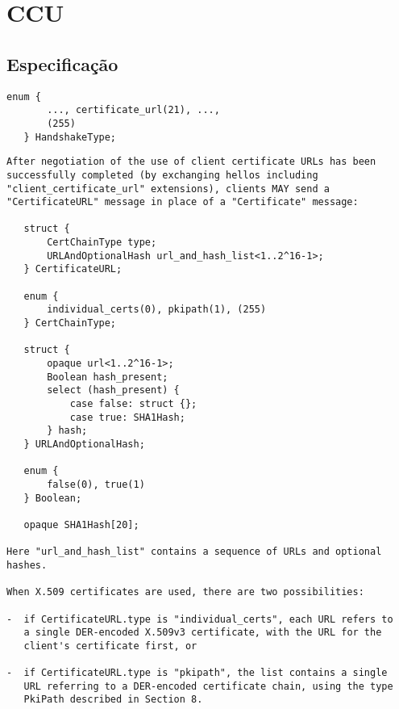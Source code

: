 
\section{\acl{CCU}}

\subsection{Especificação}

\begin{lstlisting}[caption={Definição do novo tipo de mensagem de \emph{handshake} \tlsHsCu}]
   enum { 
       ..., certificate_url(21), ..., 
       (255) 
   } HandshakeType;
\end{lstlisting}

\begin{lstlisting}[caption={RFC 3546, trecho da seção 3.3}]
After negotiation of the use of client certificate URLs has been 
successfully completed (by exchanging hellos including 
"client_certificate_url" extensions), clients MAY send a 
"CertificateURL" message in place of a "Certificate" message: 
 
   struct { 
       CertChainType type; 
       URLAndOptionalHash url_and_hash_list<1..2^16-1>; 
   } CertificateURL; 
 
   enum { 
       individual_certs(0), pkipath(1), (255) 
   } CertChainType; 
 
   struct { 
       opaque url<1..2^16-1>; 
       Boolean hash_present; 
       select (hash_present) { 
           case false: struct {}; 
           case true: SHA1Hash; 
       } hash; 
   } URLAndOptionalHash; 
 
   enum { 
       false(0), true(1) 
   } Boolean; 
 
   opaque SHA1Hash[20]; 
 
Here "url_and_hash_list" contains a sequence of URLs and optional 
hashes. 
 
When X.509 certificates are used, there are two possibilities: 
 
-  if CertificateURL.type is "individual_certs", each URL refers to 
   a single DER-encoded X.509v3 certificate, with the URL for the 
   client's certificate first, or 
 
-  if CertificateURL.type is "pkipath", the list contains a single 
   URL referring to a DER-encoded certificate chain, using the type 
   PkiPath described in Section 8.
\end{lstlisting}

